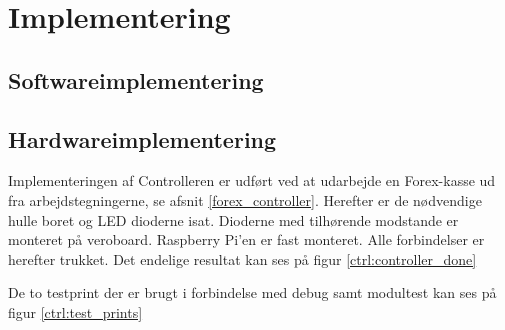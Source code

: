 \section{Implementering}

\subsection{Softwareimplementering}


\subsection{Hardwareimplementering}

Implementeringen af Controlleren er udført ved at udarbejde en Forex-kasse ud fra arbejdstegningerne, se afsnit \ref{forex_controller}. Herefter er de nødvendige hulle boret og LED dioderne isat. Dioderne med tilhørende modstande er monteret på veroboard. Raspberry Pi'en er fast monteret. Alle forbindelser er herefter trukket.
Det endelige resultat kan ses på figur \ref{ctrl:controller_done}


De to testprint der er brugt i forbindelse med debug samt modultest kan ses på figur \ref{ctrl:test_prints}

